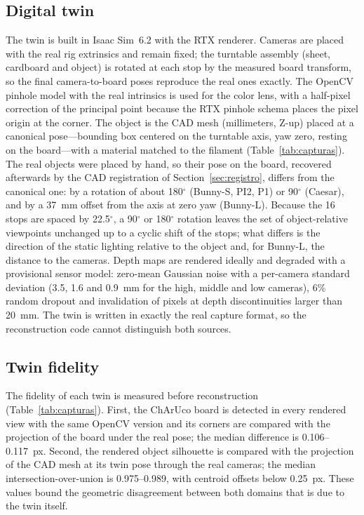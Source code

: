 \documentclass[journal]{IEEEtran}
\begin{document}
\subsection{Digital twin}
The twin is built in Isaac Sim~6.2 with the RTX renderer. Cameras are placed with the real rig extrinsics
and remain fixed; the turntable assembly (sheet, cardboard and object) is rotated at each stop by the
measured board transform, so the final camera-to-board poses reproduce the real ones exactly. The OpenCV
pinhole model with the real intrinsics is used for the color lens, with a half-pixel correction of the
principal point because the RTX pinhole schema places the pixel origin at the corner. The object is the CAD
mesh (millimeters, Z-up) placed at a canonical pose---bounding box centered on the turntable axis, yaw
zero, resting on the board---with a material matched to the filament (Table~\ref{tab:capturas}). The real
objects were placed by hand, so their pose on the board, recovered afterwards by the CAD registration of
Section~\ref{sec:registro}, differs from the canonical one: by a rotation of about 180$^\circ$ (Bunny-S,
PI2, P1) or 90$^\circ$ (Caesar), and by a 37~mm offset from the axis at zero yaw (Bunny-L). Because the
16 stops are spaced by 22.5$^\circ$, a 90$^\circ$ or 180$^\circ$ rotation leaves the set of object-relative
viewpoints unchanged up to a cyclic shift of the stops; what differs is the direction of the static
lighting relative to the object and, for Bunny-L, the distance to the cameras. Depth maps are rendered ideally and degraded with a provisional
sensor model: zero-mean Gaussian noise with a per-camera standard deviation (3.5, 1.6 and 0.9~mm for the
high, middle and low cameras), 6\% random dropout and invalidation of pixels at depth discontinuities larger
than 20~mm. The twin is written in exactly the real capture format, so the reconstruction code cannot
distinguish both sources.

\subsection{Twin fidelity}
The fidelity of each twin is measured before reconstruction (Table~\ref{tab:capturas}). First, the ChArUco
board is detected in every rendered view with the same OpenCV version and its corners are compared with
the projection of the board under the real pose; the median difference is 0.106--0.117~px. Second, the
rendered object silhouette is compared with the projection of the CAD mesh at its twin pose through the
real cameras; the median
intersection-over-union is 0.975--0.989, with centroid offsets below 0.25~px. These values bound the
geometric disagreement between both domains that is due to the twin itself.
\end{document}
